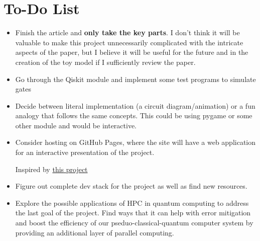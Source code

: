 \documentclass{article}
\begin{document}
\section*{To-Do List}
\begin{itemize}
    \item Finish the article and \textbf{only take the key parts}. I don't think it will be valuable to make this project unnecessarily complicated with the intricate aspects of the paper, but I believe it will be useful for the future and in the creation of the toy model if I sufficiently review the paper.
    \item Go through the Qiskit module and implement some test programs to simulate gates
    \item Decide between literal implementation (a circuit diagram/animation) or a fun analogy that follows the same concepts. This could be using pygame or some other module and would be interactive. 
    \item Consider hosting on GitHub Pages, where the site will have a web application for an interactive presentation of the project. 

    Inspired by \href{https://yizhe-ang.github.io/matrix-explorable/}{this project}
    \item Figure out complete dev stack for the project as well as find new resources. 
    \item Explore the possible applications of HPC in quantum computing to address the last goal of the project. Find ways that it can help with error mitigation and boost the efficiency of our pseduo-classical-quantum computer system by providing an additional layer of parallel computing.
\end{itemize}
\end{document}
